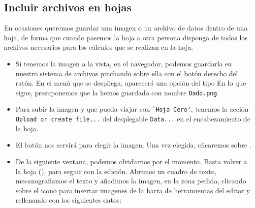 \begin{itemize}
\noindent\begin{minipage}{.45\textwidth}
\begin{itemize}

\end{itemize}
 \end{minipage}\hfill
\begin{minipage}{.45\textwidth}
\begin{itemize} 
 
\end{itemize}
\end{minipage}

\subsection*{Incluir archivos en hojas}
En ocasiones queremos guardar una imagen o un archivo de datos dentro de una
hoja, de forma que cuando pasemos la hoja a otra persona disponga de todos los
archivos necesarios para los c\'alculos que se realizan en la hoja. 
\begin{itemize}
\renewcommand{\labelitemi}{$\circ$}
 \item Si tenemos la imagen a la vista, en el navegador, podemos guardarla en
nuestro sistema de archivos pinchando sobre ella con el botón derecho del
ratón. En el menú que se despliega, aparecerá una opción del tipo
 En lo que sigue, presuponemos que la hemos
guardado con nombre \verb|Dado.png|.

\item Para subir la imagen y que pueda viajar con \verb|`Hoja Cero'|, tenemos
la acción \verb|Upload or create file...| %
del desplegable \verb|Data...| en el encabezamiento de la hoja.

\item El botón  nos servirá para elegir la imagen. Una vez
elegida, clicaremos sobre 
.

\item De la siguiente ventana, podemos olvidarnos por el momento. Basta volver
a la hoja (), para seguir con la edición. Abrimos un cuadro de
texto, mecanografiamos el texto y añadimos la imagen, en la zona pedida,
clicando sobre el icono para insertar imagenes de la barra de herramientas del
editor y rellenando con los siguientes datos:

\end{itemize}










\end{itemize}

